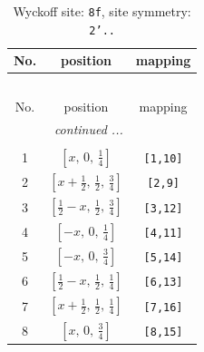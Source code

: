 \documentclass[fleqn,8pt]{jsarticle}
\begin{document}
\begin{longtable}{ccc}
\caption{Wyckoff site: {\tt 8f}, site symmetry: {\tt 2'..}}
 \\
 \hline \hline
No. & position & mapping \\ \hline \endfirsthead

\multicolumn{2}{l}{\tablename\ \thetable{}} \\
 \hline \hline
No. & position & mapping \\ \hline \endhead

 \hline \hline
\multicolumn{2}{r}{\footnotesize\it continued ...} \\ \endfoot

 \hline \hline
\multicolumn{2}{r}{} \\ \endlastfoot

1 & $\left[ x,\, 0,\, \frac{1}{4} \right]$ & {\tt [1,10]} \\ \hline
2 & $\left[ x + \frac{1}{2},\, \frac{1}{2},\, \frac{3}{4} \right]$ & {\tt [2,9]} \\ \hline
3 & $\left[ \frac{1}{2} - x,\, \frac{1}{2},\, \frac{3}{4} \right]$ & {\tt [3,12]} \\ \hline
4 & $\left[ - x,\, 0,\, \frac{1}{4} \right]$ & {\tt [4,11]} \\ \hline
5 & $\left[ - x,\, 0,\, \frac{3}{4} \right]$ & {\tt [5,14]} \\ \hline
6 & $\left[ \frac{1}{2} - x,\, \frac{1}{2},\, \frac{1}{4} \right]$ & {\tt [6,13]} \\ \hline
7 & $\left[ x + \frac{1}{2},\, \frac{1}{2},\, \frac{1}{4} \right]$ & {\tt [7,16]} \\ \hline
8 & $\left[ x,\, 0,\, \frac{3}{4} \right]$ & {\tt [8,15]} \\
\end{longtable}
\renewcommand{\arraystretch}{1.2}
\end{document}
